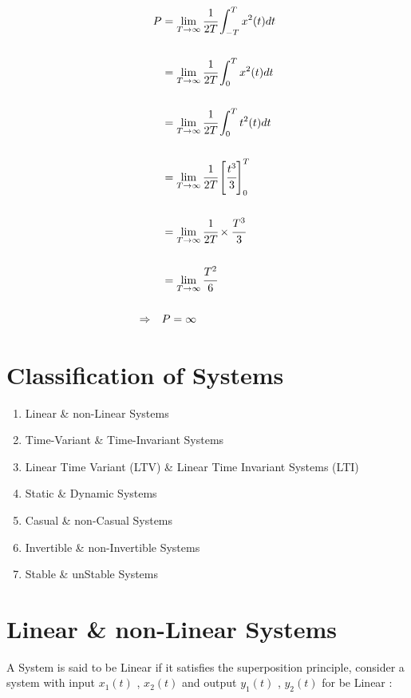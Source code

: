 \documentclass[12pt]{article}
\begin{document}
\begin{align*}
P &= \lim_{T\to\infty}{ \cfrac{1}{2T} \int_{-T}^{T}{x^{2}(t)dt} } \\ \\
&= \lim_{T\to\infty}{ \cfrac{1}{2T} \int_{0}^{T}{x^{2}(t)dt} } \\ \\
&= \lim_{T\to\infty}{ \cfrac{1}{2T} \int_{0}^{T}{t^{2}(t)dt} } \\ \\
&= \lim_{T\to\infty}{ \cfrac{1}{2T} \left[ \cfrac{t^{3}}{3} \right]_{0}^{T} } \\ \\
&=  \lim_{T\to\infty}{ \cfrac{1}{2T} \times \cfrac{T^{3}}{3} } \\ \\
&=  \lim_{T\to\infty}{ \cfrac{T^{2}}{6} } \\ \\
\Rightarrow \quad & P = \infty
\end{align*}





\section{Classification of Systems}


\begin{enumerate}
	\item Linear \& non-Linear Systems
	\item Time-Variant \& Time-Invariant Systems
	\item Linear Time Variant (LTV) \& Linear Time Invariant Systems (LTI)
	\item Static \& Dynamic Systems
	\item Casual \& non-Casual Systems
	\item Invertible \& non-Invertible Systems
	\item Stable \& unStable Systems
\end{enumerate}







\section{Linear \& non-Linear Systems}



A System is said to be Linear if it satisfies the superposition principle, consider a system with input $x_{1}(t)$ , $x_{2}(t)$ and output $y_{1}(t)$ , $y_{2}(t)$
for be Linear :
\end{document}
